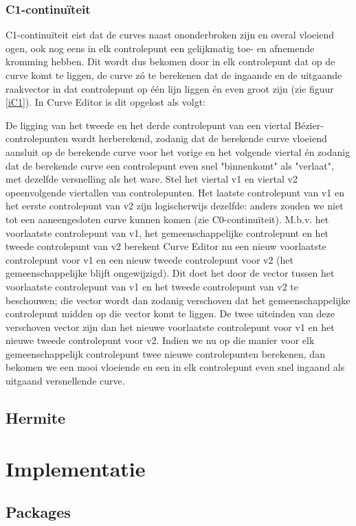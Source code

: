 \documentclass[a4paper,11pt,oneside, titlepage]{article}
\begin{document}
\subsubsection{C1-continu\"iteit \label{sC1}}
C1-continu\"iteit eist dat de curves naast ononderbroken zijn en overal vloeiend ogen, ook nog eens in elk controlepunt een gelijkmatig toe- en afnemende kromming hebben. Dit wordt dus bekomen door in elk controlepunt dat op de curve komt te liggen, de curve z\'o te berekenen dat de ingaande en de uitgaande raakvector
in dat controlepunt op \'e\'en lijn liggen \'en even groot zijn (zie figuur \ref{iC1}). In Curve Editor is dit opgelost als volgt:

De ligging van het tweede en het derde controlepunt van een viertal B\'ezier-controlepunten wordt herberekend, zodanig dat de berekende curve vloeiend aansluit op de berekende curve voor het vorige en het volgende viertal \'en zodanig dat de berekende curve een controlepunt even snel "binnenkomt" als "verlaat", met dezelfde versnelling als het ware. Stel het viertal v1 en viertal v2 opeenvolgende viertallen van controlepunten. Het laatste controlepunt van v1 en het eerste controlepunt van v2 zijn logischerwijs dezelfde: anders zouden we niet tot een aaneengesloten curve kunnen komen (zie C0-continu\"iteit). M.b.v. het voorlaatste controlepunt van v1, het gemeenschappelijke controlepunt en het tweede controlepunt van v2 berekent Curve Editor nu een nieuw voorlaatste controlepunt voor v1 en een nieuw tweede controlepunt voor v2 (het gemeenschappelijke blijft ongewijzigd). Dit doet het door de vector tussen het voorlaatste controlepunt van v1 en het tweede controlepunt van v2 te beschouwen; die vector wordt dan zodanig verschoven dat het gemeenschappelijke controlepunt midden op die vector komt te liggen. De twee uiteinden van deze verschoven vector zijn dan het nieuwe voorlaatste controlepunt voor v1 en het nieuwe tweede controlepunt voor v2. Indien we nu op die manier voor elk gemeenschappelijk controlepunt twee nieuwe controlepunten berekenen, dan bekomen we een mooi vloeiende en een in elk controlepunt even snel ingaand als uitgaand versnellende curve.
\subsection{Hermite}
\newpage
\section{Implementatie}
\subsection{Packages}
\end{document}
